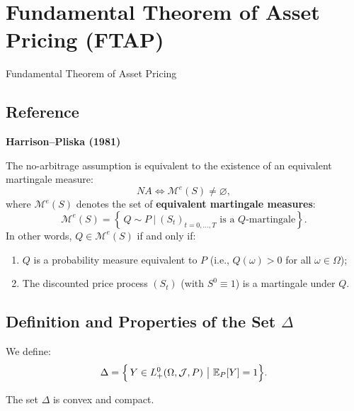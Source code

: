\chapter{Fundamental Theorem of Asset Pricing (FTAP)}

Fundamental Theorem of Asset Pricing

\section{Reference}
\textbf{Harrison--Pliska (1981)}

\begin{theorem}
The no-arbitrage assumption is equivalent to the existence of an equivalent martingale measure:
\begin{equation}
NA \Longleftrightarrow \mathcal{M}^e(S) \neq \varnothing,
\end{equation}
where $\mathcal{M}^e(S)$ denotes the set of \textbf{equivalent martingale measures}:
\begin{equation}
\mathcal{M}^e(S) = \left\{\, Q \sim P \ \Big|\ (S_t)_{t=0,\dots,T} \text{ is a } Q\text{-martingale} \right\}.
\end{equation}
In other words, $Q \in \mathcal{M}^e(S)$ if and only if:
\begin{enumerate}
    \item $Q$ is a probability measure equivalent to $P$ (i.e., $Q(\omega) > 0$ for all $\omega \in \Omega$);
    \item The discounted price process $(S_t)$ (with $S^0 \equiv 1$) is a martingale under $Q$.
\end{enumerate}
\end{theorem}

\section{Definition and Properties of the Set $\Delta$}

\begin{definition}
We define:
\begin{equation}
\Delta = \Bigl\{\, Y \in L_+^0(\Omega, \mathcal{J}, P) \ \big|\ \mathbb{E}_P[Y] = 1 \Bigr\}.
\end{equation}
\end{definition}

\begin{lemma}
The set $\Delta$ is convex and compact.
\end{lemma}

